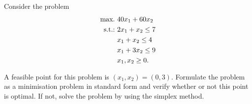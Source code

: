Consider the problem
%
\begin{align*}
	\mathop{\text{max.~}} & 40x_1 + 60 x_2   \\
	\mathop{\text{s.t.:~}}   & 2x_1 + x_2 \le 7 \\
		  & x_1 + x_2 \le 4  \\
		  & x_1 + 3x_2 \le 9 \\
		  & x_1, x_2 \ge 0.
\end{align*}

A feasible point for this problem is $(x_1,x_2)=(0,3)$. Formulate the problem as a minimisation problem in standard form and verify whether or not this point is optimal. If not, solve the problem by using the simplex method.